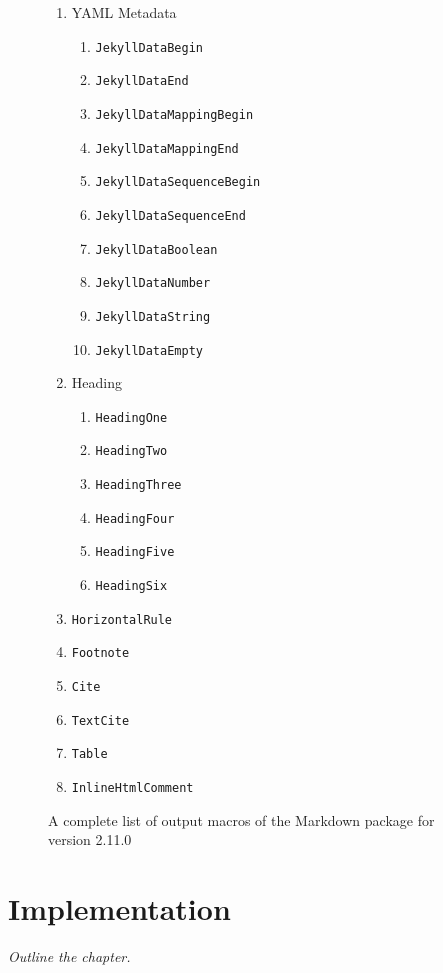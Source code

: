 \documentclass[
  digital,     %
  oneside,     %
  nosansbold,  %
  nocolorbold, %
  lof,         %
  lot,         %
]{fithesis4}
\begin{document}
\begin{figure}
\begin{multicols}{2}
\begin{enumerate}
      \item YAML Metadata
      \begin{enumerate}  %
        \item \texttt{JekyllDataBegin}
        \item \texttt{JekyllDataEnd}
        \item \texttt{JekyllDataMappingBegin}
        \item \texttt{JekyllDataMappingEnd}
        \item \texttt{JekyllDataSequenceBegin}
        \item \texttt{JekyllDataSequenceEnd}
        \item \texttt{JekyllDataBoolean}
        \item \texttt{JekyllDataNumber}
        \item \texttt{JekyllDataString}
        \item \texttt{JekyllDataEmpty}
      \end{enumerate}
      \item Heading
      \begin{enumerate}
        \item \texttt{HeadingOne}
        \item \texttt{HeadingTwo}
        \item \texttt{HeadingThree}
        \item \texttt{HeadingFour}
        \item \texttt{HeadingFive}
        \item \texttt{HeadingSix}
      \end{enumerate}
      \item \texttt{HorizontalRule}
      \item \texttt{Footnote}
      \item \texttt{Cite}
      \item \texttt{TextCite}
      \item \texttt{Table}
      \item \texttt{InlineHtmlComment}
    \end{enumerate}
  \end{multicols}
  \vspace*{-1em}
  \caption{A complete list of output macros of the Markdown package for version 2.11.0}
  \label{fig:markdown-renderers}
\end{figure}

\chapter{Implementation}
\emph{Outline the chapter.}
\end{document}
